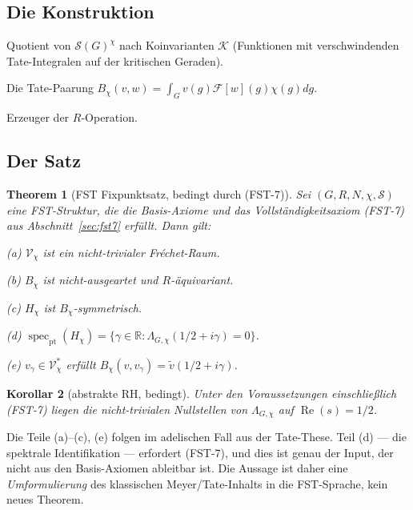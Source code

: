 \documentclass[11pt,a4paper]{article}
\theoremstyle{plain}
\newtheorem{theorem}{Theorem}[section]
\newtheorem{corollary}[theorem]{Korollar}
\theoremstyle{definition}
\DeclareMathOperator{\spec}{spec}
\newcommand{\R}{\mathbb{R}}
\newcommand{\V}{\mathcal{V}}
\renewcommand{\S}{\mathcal{S}}
\newcommand{\K}{\mathcal{K}}
\newcommand{\chifn}{\chi}
\renewcommand{\Re}{\operatorname{Re}}
\begin{document}
\subsection{Die Konstruktion}

\begin{description}[style=nextline]
\item[$\V_\chifn$] Quotient von $\S(G)^\chifn$ nach Koinvarianten $\K$
  (Funktionen mit verschwindenden Tate-Integralen auf der kritischen Geraden).
\item[$B_\chifn$] Die Tate-Paarung $B_\chifn(v, w) = \int_G v(g)
  \mathcal F[w](g) \chifn(g) dg$.
\item[$H_\chifn$] Erzeuger der $R$-Operation.
\end{description}

\subsection{Der Satz}

\begin{theorem}[FST Fixpunktsatz, bedingt durch (FST-7)]
\label{thm:fst-fixed-point}
Sei $(G, R, N, \chifn, \S)$ eine FST-Struktur, die die Basis-Axiome und das Vollständigkeitsaxiom (FST-7) aus Abschnitt~\ref{sec:fst7} erfüllt. Dann gilt:

\noindent(a) $\V_\chifn$ ist ein nicht-trivialer Fr\'echet-Raum.

\noindent(b) $B_\chifn$ ist nicht-ausgeartet und $R$-äquivariant.

\noindent(c) $H_\chifn$ ist $B_\chifn$-symmetrisch.

\noindent(d) $\spec_\mathrm{pt}(H_\chifn) = \{\gamma \in \R :
  \Lambda_{G,\chifn}(1/2 + i\gamma) = 0\}$.

\noindent(e) $v_\gamma \in \V_\chifn^\ast$ erfüllt
  $B_\chifn(v, v_\gamma) = \tilde v(1/2 + i\gamma)$.
\end{theorem}

\begin{corollary}[abstrakte RH, bedingt]
\label{cor:abstract-rh}
Unter den Voraussetzungen \emph{einschließlich (FST-7)} liegen die nicht-trivialen Nullstellen von $\Lambda_{G,\chifn}$ auf $\Re(s) = 1/2$.
\end{corollary}

Die Teile (a)--(c), (e) folgen im adelischen Fall aus der Tate-These.
Teil (d) --- die spektrale Identifikation --- erfordert (FST-7), und dies ist genau der Input, der nicht aus den Basis-Axiomen ableitbar ist. Die Aussage ist daher eine \emph{Umformulierung} des klassischen Meyer/Tate-Inhalts in die FST-Sprache, kein neues Theorem.
\end{document}
